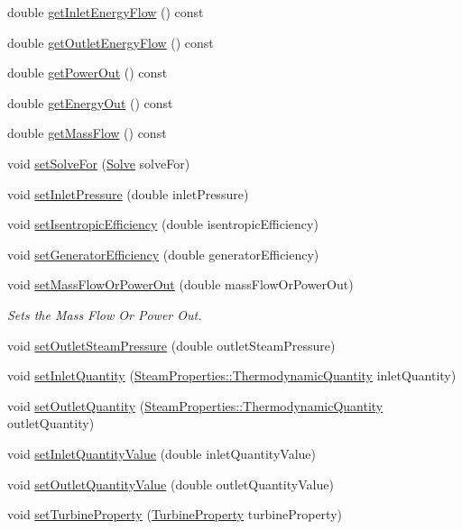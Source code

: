 \begin{DoxyCompactItemize}
\item 
double \hyperlink{class_turbine_ae5d55a7b882e4780d490d43409f8f06c}{get\+Inlet\+Energy\+Flow} () const
\item 
double \hyperlink{class_turbine_aa20c0f9dd81cd9bfd5eda77f588516b5}{get\+Outlet\+Energy\+Flow} () const
\item 
double \hyperlink{class_turbine_a89585cc2fbfdbe67d539eae08c369fa2}{get\+Power\+Out} () const
\item 
double \hyperlink{class_turbine_a143fc660274e0d65ccb8fc55cc2caf83}{get\+Energy\+Out} () const
\item 
double \hyperlink{class_turbine_a4893a203dbbf9db9ca77a0b278c4c118}{get\+Mass\+Flow} () const
\item 
void \hyperlink{class_turbine_a96f54a8fc572dae6c5298289de890f4d}{set\+Solve\+For} (\hyperlink{class_turbine_a9fd7beba6c6f071e228fbe3e07969d2b}{Solve} solve\+For)
\item 
void \hyperlink{class_turbine_a04996baab9a40d449a69c737c00be8e4}{set\+Inlet\+Pressure} (double inlet\+Pressure)
\item 
void \hyperlink{class_turbine_ae67daa481ef48bcf8aef84bcccb4611d}{set\+Isentropic\+Efficiency} (double isentropic\+Efficiency)
\item 
void \hyperlink{class_turbine_a51e9c5050a5be51b86dc23e690bd3f40}{set\+Generator\+Efficiency} (double generator\+Efficiency)
\item 
void \hyperlink{class_turbine_a73522631e2eeefa8ea14d5b537e3e760}{set\+Mass\+Flow\+Or\+Power\+Out} (double mass\+Flow\+Or\+Power\+Out)
\begin{DoxyCompactList}\small\item\em Sets the Mass Flow Or Power Out. \end{DoxyCompactList}\item 
void \hyperlink{class_turbine_ab9612657de02e4523492b687917b4091}{set\+Outlet\+Steam\+Pressure} (double outlet\+Steam\+Pressure)
\item 
void \hyperlink{class_turbine_aecc05c70870fb11bbc0bb4fe5d8438bd}{set\+Inlet\+Quantity} (\hyperlink{class_steam_properties_ae0294bedf7d178c2d8fb6aed0f62fbff}{Steam\+Properties\+::\+Thermodynamic\+Quantity} inlet\+Quantity)
\item 
void \hyperlink{class_turbine_ad5ff4ba1657aac9519a6841336ec571c}{set\+Outlet\+Quantity} (\hyperlink{class_steam_properties_ae0294bedf7d178c2d8fb6aed0f62fbff}{Steam\+Properties\+::\+Thermodynamic\+Quantity} outlet\+Quantity)
\item 
void \hyperlink{class_turbine_ac01a053462c83e21ecc2158e75477542}{set\+Inlet\+Quantity\+Value} (double inlet\+Quantity\+Value)
\item 
void \hyperlink{class_turbine_ab37326068f633280de8f8144b9c8eb89}{set\+Outlet\+Quantity\+Value} (double outlet\+Quantity\+Value)
\item 
void \hyperlink{class_turbine_abb3f16cefe52f4e9c7b32b2bb17a68ee}{set\+Turbine\+Property} (\hyperlink{class_turbine_a5db4f65cf2539e3837684d53221ade12}{Turbine\+Property} turbine\+Property)
\end{DoxyCompactItemize}
